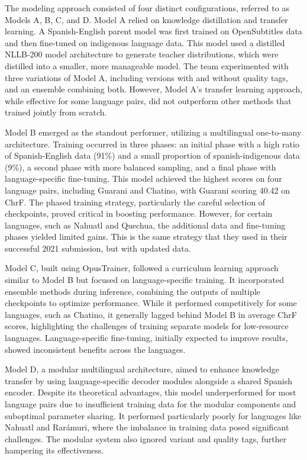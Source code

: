 The modeling approach consisted of four distinct configurations, referred to as Models A, B, C, and D. Model A relied on knowledge distillation and transfer learning. A Spanish-English parent model was first trained on OpenSubtitles data and then fine-tuned on indigenous language data. This model used a distilled NLLB-200 model architecture to generate teacher distributions, which were distilled into a smaller, more manageable model. The team experimented with three variations of Model A, including versions with and without quality tags, and an ensemble combining both. However, Model A’s transfer learning approach, while effective for some language pairs, did not outperform other methods that trained jointly from scratch.

Model B emerged as the standout performer, utilizing a multilingual one-to-many architecture. Training occurred in three phases: an initial phase with a high ratio of Spanish-English data (91\%) and a small proportion of spanish-indigenous data (9\%), a second phase with more balanced sampling, and a final phase with language-specific fine-tuning. This model achieved the highest scores on four language pairs, including Guarani and Chatino, with Guarani scoring 40.42 on ChrF. The phased training strategy, particularly the careful selection of checkpoints, proved critical in boosting performance. However, for certain languages, such as Nahuatl and Quechua, the additional data and fine-tuning phases yielded limited gains. This is the same strategy that they used in their successful 2021 submission, but with updated data. 

Model C, built using OpusTrainer, followed a curriculum learning approach similar to Model B but focused on language-specific training. It incorporated ensemble methods during inference, combining the outputs of multiple checkpoints to optimize performance. While it performed competitively for some languages, such as Chatino, it generally lagged behind Model B in average ChrF scores, highlighting the challenges of training separate models for low-resource languages. Language-specific fine-tuning, initially expected to improve results, showed inconsistent benefits across the languages.

Model D, a modular multilingual architecture, aimed to enhance knowledge transfer by using language-specific decoder modules alongside a shared Spanish encoder. Despite its theoretical advantages, this model underperformed for most language pairs due to insufficient training data for the modular components and suboptimal parameter sharing. It performed particularly poorly for languages like Nahuatl and Rarámuri, where the imbalance in training data posed significant challenges. The modular system also ignored variant and quality tags, further hampering its effectiveness.

